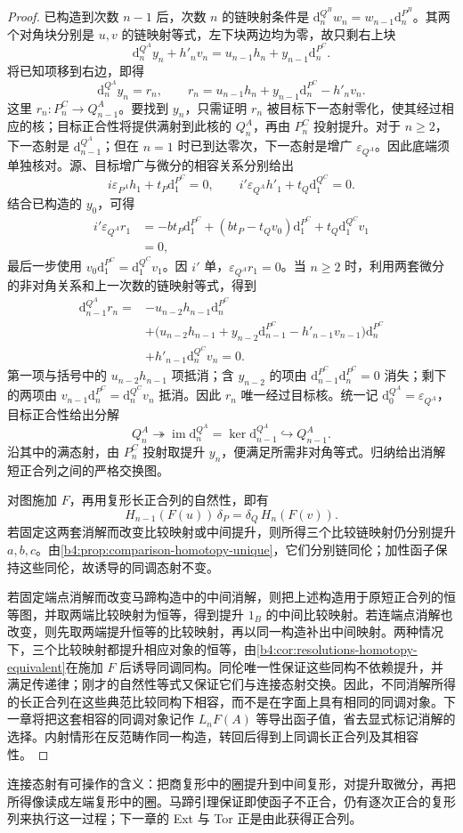 \begin{proof}
	已构造到次数 \(n-1\) 后，次数 \(n\) 的链映射条件是 \(\mathrm{d}_n^{Q^B}w_n=w_{n-1}\mathrm{d}_n^{P^B}\)。其两个对角块分别是 \(u,v\) 的链映射等式，左下块两边均为零，故只剩右上块
	\[
		\mathrm{d}_n^{Q^A}y_n+h'_nv_n =u_{n-1}h_n+y_{n-1}\mathrm{d}_n^{P^C}.
	\]
	将已知项移到右边，即得
	\[
		\mathrm{d}_n^{Q^A}y_n=r_n, \qquad r_n=u_{n-1}h_n+y_{n-1}\mathrm{d}_n^{P^C}-h'_nv_n.
	\]
	这里 \(r_n:P_n^C\to Q_{n-1}^A\)。要找到 \(y_n\)，只需证明 \(r_n\) 被目标下一态射零化，使其经过相应的核；目标正合性将提供满射到此核的 \(Q_n^A\)，再由 \(P_n^C\) 投射提升。对于 \(n\ge2\)，下一态射是 \(\mathrm{d}_{n-1}^{Q^A}\)；但在 \(n=1\) 时已到达零次，下一态射是增广 \(\varepsilon_{Q^A}\)。因此底端须单独核对。源、目标增广与微分的相容关系分别给出
	\[
		i\varepsilon_{P^A}h_1+t_P\mathrm{d}_1^{P^C}=0, \qquad i'\varepsilon_{Q^A}h'_1+t_Q\mathrm{d}_1^{Q^C}=0.
	\]
	结合已构造的 \(y_0\)，可得
	\[
		\begin{aligned}
			i'\varepsilon_{Q^A}r_1 &=-bt_P\mathrm{d}_1^{P^C} +(bt_P-t_Qv_0)\mathrm{d}_1^{P^C} +t_Q\mathrm{d}_1^{Q^C}v_1\\
			&=0,
		\end{aligned}
	\]
	最后一步使用 \(v_0\mathrm{d}_1^{P^C}=\mathrm{d}_1^{Q^C}v_1\)。因 \(i'\) 单，\(\varepsilon_{Q^A}r_1=0\)。当 \(n\ge2\) 时，利用两套微分的非对角关系和上一次数的链映射等式，得到
	\[
		\begin{aligned}
			\mathrm{d}_{n-1}^{Q^A}r_n ={}&-u_{n-2}h_{n-1}\mathrm{d}_n^{P^C}\\
			&+\bigl(u_{n-2}h_{n-1} +y_{n-2}\mathrm{d}_{n-1}^{P^C} -h'_{n-1}v_{n-1}\bigr)\mathrm{d}_n^{P^C}\\
			&+h'_{n-1}\mathrm{d}_n^{Q^C}v_n =0.
		\end{aligned}
	\]
	第一项与括号中的 \(u_{n-2}h_{n-1}\) 项抵消；含 \(y_{n-2}\) 的项由 \(\mathrm{d}_{n-1}^{P^C}\mathrm{d}_n^{P^C}=0\) 消失；剩下的两项由 \(v_{n-1}\mathrm{d}_n^{P^C}=\mathrm{d}_n^{Q^C}v_n\) 抵消。因此 \(r_n\) 唯一经过目标核。统一记 \(\mathrm{d}_0^{Q^A}=\varepsilon_{Q^A}\)，目标正合性给出分解
	\[
		Q_n^A\twoheadrightarrow\operatorname{im}\mathrm{d}_n^{Q^A} =\ker\mathrm{d}_{n-1}^{Q^A} \hookrightarrow Q_{n-1}^A.
	\]
	沿其中的满态射，由 \(P_n^C\) 投射取提升 \(y_n\)，便满足所需非对角等式。归纳给出消解短正合列之间的严格交换图。

	对图施加 \(F\)，再用复形长正合列的自然性，即有
	\[
		H_{n-1}(F(u))\,\delta_P =\delta_Q\,H_n(F(v)).
	\]
	若固定这两套消解而改变比较映射或中间提升，则所得三个比较链映射仍分别提升 \(a,b,c\)。由\cref{b4:prop:comparison-homotopy-unique}，它们分别链同伦；加性函子保持这些同伦，故诱导的同调态射不变。

	若固定端点消解而改变马蹄构造中的中间消解，则把上述构造用于原短正合列的恒等图，并取两端比较映射为恒等，得到提升 \(1_B\) 的中间比较映射。若连端点消解也改变，则先取两端提升恒等的比较映射，再以同一构造补出中间映射。两种情况下，三个比较映射都提升相应对象的恒等，由\cref{b4:cor:resolutions-homotopy-equivalent}在施加 \(F\) 后诱导同调同构。同伦唯一性保证这些同构不依赖提升，并满足传递律；刚才的自然性等式又保证它们与连接态射交换。因此，不同消解所得的长正合列在这些典范比较同构下相容，而不是在字面上具有相同的同调对象。下一章将把这套相容的同调对象记作 \(L_nF(A)\) 等导出函子值，省去显式标记消解的选择。内射情形在反范畴作同一构造，转回后得到上同调长正合列及其相容性。
\end{proof}

连接态射有可操作的含义：把商复形中的圈提升到中间复形，对提升取微分，再把所得像读成左端复形中的圈。马蹄引理保证即使函子不正合，仍有逐次正合的复形列来执行这一过程；下一章的 Ext 与 Tor 正是由此获得正合列。
